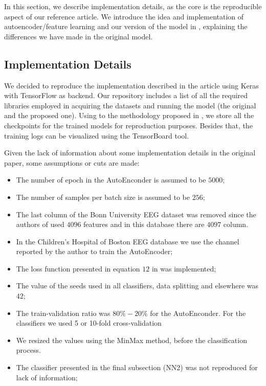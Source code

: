 In this section, we describe implementation details, as the core is the reproducible aspect of our reference article. We introduce the idea and implementation of autoencoder/feature learning and our version of the model in \cite{WenZha:2018}, explaining the differences we have made in the original model.

\subsection{Implementation Details}\label{subsec:implementation}

We decided to reproduce the implementation described in the article using Keras \cite{chollet2018keras} with TensorFlow  \cite{tensorflow} as backend. Our repository includes a list of all the required libraries employed in acquiring the datasets and running the model (the original and the proposed one). Using to the methodology proposed in \cite{Fuente:2019}, we store all the checkpoints for the trained models for reproduction purposes. Besides that, the training logs can be visualized using the TensorBoard tool.

Given the lack of information about some implementation details in the original paper, some assumptions or cuts are made: 

\begin{itemize}
\item The number of epoch in the AutoEnconder is assumed to be $5000$; 
\item The number of samples per batch size is assumed to be $256$; 
\item The last column of the Bonn University EEG dataset was removed since the authors of \cite{WenZha:2018} used $4096$ features and in this database there are $4097$ column. 
\item In the Children's Hospital of Boston EEG database we use the channel reported by the author to train the AutoEncoder;
\item The loss function presented in equation $12$ in \cite{WenZha:2018} was implemented; 
\item The value of the seeds used in all classifiers, data splitting and elsewhere was $42$; 
\item The train-validation ratio was $80\%-20\%$ for the AutoEnconder. For the classifiers we used 5 or 10-fold cross-validation 
\item We resized the values using the MinMax method, before the classification process.
\item The classifier presented in the final subsection (NN2) was not reproduced for lack of information; 
\end{itemize}

